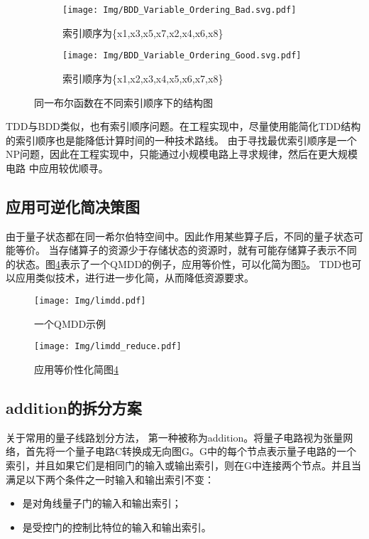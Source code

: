 \begin{figure}[!htbp]
	\centering
	\begin{subfigure}[b]{.4\textwidth}
        \centering
        \texttt{[image: Img/BDD\_Variable\_Ordering\_Bad.svg.pdf]}
		\caption{索引顺序为\{x1,x3,x5,x7,x2,x4,x6,x8\}}
		\label{fig:bdd-bad}
	\end{subfigure}
	\begin{subfigure}[b]{.4\textwidth}
        \centering
        \texttt{[image: Img/BDD\_Variable\_Ordering\_Good.svg.pdf]}
		\caption{索引顺序为\{x1,x2,x3,x4,x5,x6,x7,x8\}}
		\label{fig:bdd-good}
	\end{subfigure}
	\caption{同一布尔函数在不同索引顺序下的结构图\citep{wiki:bdd}}
	\label{fig:bdd-compare}
\end{figure}

TDD与BDD类似，也有索引顺序问题。在工程实现中，尽量使用能简化TDD结构的索引顺序也是能降低计算时间的一种技术路线。
由于寻找最优索引顺序是一个NP问题，因此在工程实现中，只能通过小规模电路上寻求规律，然后在更大规模电路
中应用较优顺寻。
\subsection{应用可逆化简决策图}
由于量子状态都在同一希尔伯特空间中。因此作用某些算子后，不同的量子状态可能等价。
当存储算子的资源少于存储状态的资源时，就有可能存储算子表示不同的状态\citep{vinkhuijzen2023limdd}。图\ref{fig:qmdd-example}表示了一个QMDD的例子，应用等价性，可以化简为图\ref{fig:limdd-example}。
TDD也可以应用类似技术，进行进一步化简，从而降低资源要求。
\begin{figure}[!htbp]
    \centering
    \texttt{[image: Img/limdd.pdf]}
    \caption{一个QMDD示例}
    \label{fig:qmdd-example}
\end{figure}
\begin{figure}[!htbp]
    \centering
    \texttt{[image: Img/limdd\_reduce.pdf]}
    \caption{应用等价性化简图\ref{fig:qmdd-example}}
    \label{fig:limdd-example}
\end{figure}
\subsection{addition的拆分方案}
\label{addition}
关于常用的量子线路划分方法，
第一种被称为addition\citep{chen2018classical}。将量子电路视为张量网络，首先将一个量子电路C转换成无向图G。G中的每个节点表示量子电路的一个索引，并且如果它们是相同门的输入或输出索引，则在G中连接两个节点。并且当满足以下两个条件之一时输入和输出索引不变：
\begin{itemize}
	\item 是对角线量子门的输入和输出索引；
	\item 是受控门的控制比特位的输入和输出索引。
\end{itemize}
	

